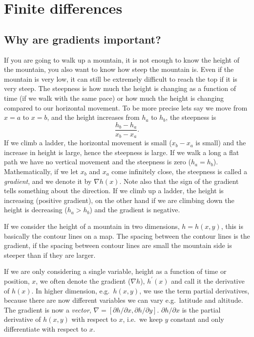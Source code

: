 \documentclass[graybox,sectrefs,envcountresetchap,open=right,final]{svmonodo}
\newenvironment{graybox2admon}[1][]{
\begin{graybox2mdframed}[frametitle=#1]
}
{
\end{graybox2mdframed}
}
\begin{document}
\noindent
\chapter{Finite differences}
\label{ch:taylor}

\section{Why are gradients important?}
If you are going to walk up a mountain, it is not enough to know the height of the mountain, you also want to know how steep the mountain is. Even if the mountain is very low, it can still be extremely difficult to reach the top if it is very steep. The steepness is how much the height is changing as a function of time (if we walk with the same pace) or how much the height is changing compared to our horizontal movement. To be more precise lets say we move from $x=a$ to $x=b$, and the height increases from $h_a$ to $h_b$, the steepness is
\begin{equation}
\frac{h_b-h_a}{x_b-x_a}.
\label{eq:tay:gradb}
\end{equation}
If we climb a ladder, the horizontal movement is small ($x_b-x_a$ is small) and the increase in height is large, hence the steepness is large. If we walk a long a flat path we have no vertical movement and the steepness is zero ($h_a=h_b$). Mathematically, if we let $x_b$ and $x_a$ come infinitely close, the steepness is called a \emph{gradient}, and we denote it by $\nabla h(x)$. Note also that the sign of the gradient tells something about the direction. If we climb up a ladder, the height is increasing (positive gradient), on the other hand if we are climbing down the height is decreasing ($h_a>h_b$) and the gradient is negative. 

If we consider the height of a mountain in two dimensions, $h=h(x,y)$, this is basically the contour lines on a map. The spacing between the contour lines is the gradient, if the spacing between contour lines are small the mountain side is steeper than if they are larger.  



\begin{graybox2admon}[Gradients vs derivatives]
If we are only considering a single variable, height as a function of time or position, $x$, we often denote the gradient ($\nabla h$), $h^\prime(x)$ and call it the derivative of $h(x)$. In higher dimension, e.g.~$h(x,y)$, we use the term partial derivatives, because there are now different variables we can vary e.g.~latitude and altitude. The gradient is now a \emph{vector}, $\nabla=[\partial h/\partial x, \partial h/\partial y]$. $\partial h/\partial x$ is the partial derivative of $h(x,y)$ with respect to $x$, i.e.~we keep $y$ constant and only differentiate with respect to $x$.
\end{graybox2admon}
\end{document}
